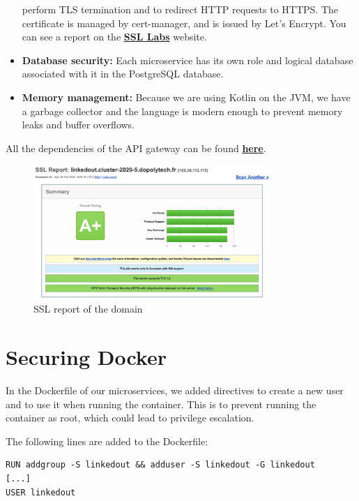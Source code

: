 \documentclass[12pt,x11names]{article}
\begin{document}
\begin{itemize}
  perform TLS termination and to redirect HTTP requests to HTTPS. The certificate is managed
  by cert-manager, and is issued by Let's Encrypt. You can see a report on the \href{https://www.ssllabs.com/ssltest/analyze.html?d=linkedout.cluster%2d2020%2d5.dopolytech.fr&latest}{\textbf{SSL Labs}} website.
  \item \textbf{Database security:} Each microservice has its own role and logical database
  associated with it in the PostgreSQL database.
  \item \textbf{Memory management:} Because we are using Kotlin on the JVM, we have a 
  garbage collector and the language is modern enough to prevent memory leaks and buffer
  overflows.
\end{itemize}

All the dependencies of the API gateway can be found \href{https://github.com/thomas-mauran/LinkedOut/blob/main/backend/api_gateway/build.gradle.kts}{\textbf{here}}.

\begin{figure}[H]
  \centering
  \includegraphics[width=0.8\textwidth]{imgs/ssl_report.png}
  \caption{SSL report of the domain}
\end{figure}

\section{Securing Docker}

In the Dockerfile of our microservices, we added directives to create a new user and to
use it when running the container. This is to prevent running the container as root, which
could lead to privilege escalation.

\medskip
The following lines are added to the Dockerfile:

\begin{lstlisting}
RUN addgroup -S linkedout && adduser -S linkedout -G linkedout
[...]
USER linkedout
\end{lstlisting}
\end{document}
